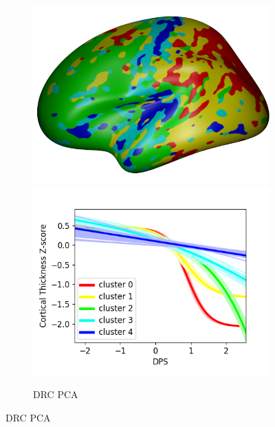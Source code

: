 \begin{figure}
  \begin{subfigure}[b]{\textwidth}
   \centering
  \includegraphics[width=\scalingFactorSubfigBrain \textwidth,trim=0 0 0 20,clip]{images/atrophyExtent24_drcThInitk-meansCl5Pr1Ra1_VDPM_MRFPCA.png} \includegraphics[width=\scalingFactorSubfigBrain \textwidth,trim=0 10 0 30,clip]{images/trajSamplesOneFig_drcThInitk-meansCl5Pr1Ra1_VDPM_MRFPCA.png}
    \caption{DRC PCA}
    \label{diveClustDrcPca}
  \end{subfigure}
  

\end{figure}
